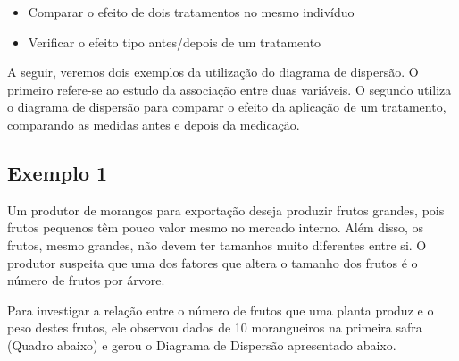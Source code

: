 \documentclass[
]{book}
\providecommand{\tightlist}{%
  \setlength{\itemsep}{0pt}\setlength{\parskip}{0pt}}
\begin{document}
\begin{itemize}
\tightlist
\item
  Comparar o efeito de dois tratamentos no mesmo indivíduo
\item
  Verificar o efeito tipo antes/depois de um tratamento
\end{itemize}

A seguir, veremos dois exemplos da utilização do diagrama de dispersão. O primeiro refere-se ao estudo da associação entre duas variáveis. O segundo utiliza o diagrama de dispersão para comparar o efeito da aplicação de um tratamento, comparando as medidas antes e depois da medicação.

\hypertarget{exemplo-1}{%
\subsection{Exemplo 1}\label{exemplo-1}}

Um produtor de morangos para exportação deseja produzir frutos grandes, pois frutos pequenos têm pouco valor mesmo no mercado interno. Além disso, os frutos, mesmo grandes, não devem ter tamanhos muito diferentes entre si. O produtor suspeita que uma dos fatores que altera o tamanho dos frutos é o número de frutos por árvore.

Para investigar a relação entre o número de frutos que uma planta produz e o peso destes frutos, ele observou dados de 10 morangueiros na primeira safra (Quadro abaixo) e gerou o Diagrama de Dispersão apresentado abaixo.
\end{document}
